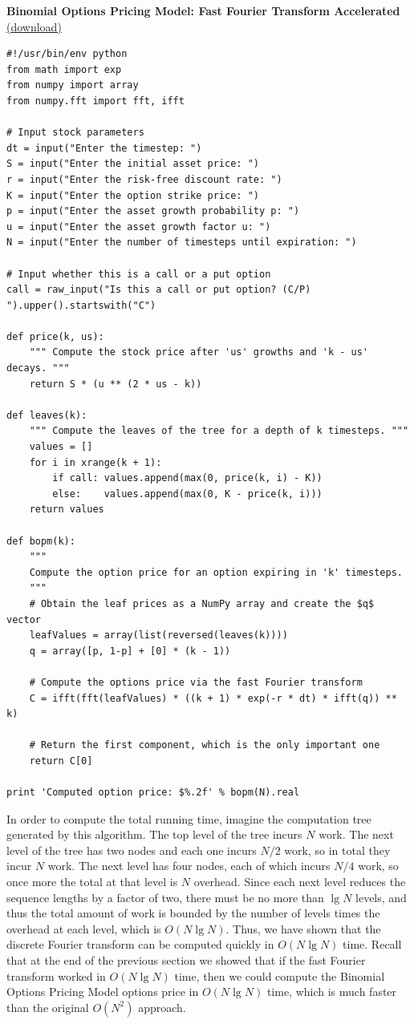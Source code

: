 \documentclass[11pt]{article}
\begin{document}
\begin{center}

\textbf{Binomial Options Pricing Model: Fast Fourier Transform Accelerated} \href{http://andrew.gibiansky.com/downloads/code/bopm\_fft.py}{(download)}

\begin{verbatim}
#!/usr/bin/env python
from math import exp
from numpy import array
from numpy.fft import fft, ifft

# Input stock parameters
dt = input("Enter the timestep: ")
S = input("Enter the initial asset price: ")
r = input("Enter the risk-free discount rate: ")
K = input("Enter the option strike price: ")
p = input("Enter the asset growth probability p: ")
u = input("Enter the asset growth factor u: ")
N = input("Enter the number of timesteps until expiration: ")

# Input whether this is a call or a put option
call = raw_input("Is this a call or put option? (C/P) ").upper().startswith("C")

def price(k, us):
    """ Compute the stock price after 'us' growths and 'k - us' decays. """
    return S * (u ** (2 * us - k))

def leaves(k):
    """ Compute the leaves of the tree for a depth of k timesteps. """
    values = []
    for i in xrange(k + 1):
        if call: values.append(max(0, price(k, i) - K))
        else:    values.append(max(0, K - price(k, i)))
    return values

def bopm(k):
    """
    Compute the option price for an option expiring in 'k' timesteps.
    """
    # Obtain the leaf prices as a NumPy array and create the $q$ vector
    leafValues = array(list(reversed(leaves(k))))
    q = array([p, 1-p] + [0] * (k - 1))

    # Compute the options price via the fast Fourier transform
    C = ifft(fft(leafValues) * ((k + 1) * exp(-r * dt) * ifft(q)) ** k)

    # Return the first component, which is the only important one
    return C[0]

print 'Computed option price: $%.2f' % bopm(N).real
    \end{verbatim}
\end{center}
\newpage

In order to compute the total running time, imagine the computation tree generated by this
algorithm. The top level of the tree incurs $N$ work. The next level of the tree has two nodes
and each one incurs $N/2$ work, so in total they incur $N$ work. The next level has four nodes, each
of which incurs $N/4$ work, so once more the total at that level is $N$ overhead. Since each next
level reduces the sequence lengths by a factor of two, there must be no more than $\lg N$ levels,
and thus the total amount of work is bounded by the number of levels times the overhead at each
level, which is $O(N \lg N)$. Thus, we have shown that the discrete Fourier transform can be
computed quickly in $O(N \lg N)$ time. Recall that at the end of the previous section we
showed that if the fast Fourier transform worked in $O(N \lg N)$ time, then we could compute the
Binomial Options Pricing Model options price in $O(N \lg N)$ time, which is much faster than the
original $O(N^2)$ approach.
\end{document}

